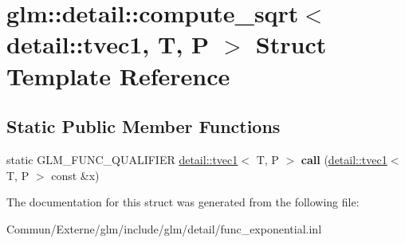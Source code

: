 \hypertarget{structglm_1_1detail_1_1compute__sqrt_3_01detail_1_1tvec1_00_01_t_00_01_p_01_4}{}\section{glm\+:\+:detail\+:\+:compute\+\_\+sqrt$<$ detail\+:\+:tvec1, T, P $>$ Struct Template Reference}
\label{structglm_1_1detail_1_1compute__sqrt_3_01detail_1_1tvec1_00_01_t_00_01_p_01_4}
\subsection*{Static Public Member Functions}
\begin{DoxyCompactItemize}
\item 
static G\+L\+M\+\_\+\+F\+U\+N\+C\+\_\+\+Q\+U\+A\+L\+I\+F\+I\+ER \hyperlink{structglm_1_1detail_1_1tvec1}{detail\+::tvec1}$<$ T, P $>$ {\bfseries call} (\hyperlink{structglm_1_1detail_1_1tvec1}{detail\+::tvec1}$<$ T, P $>$ const \&x)\hypertarget{structglm_1_1detail_1_1compute__sqrt_3_01detail_1_1tvec1_00_01_t_00_01_p_01_4_a19be057111b1a9d9459f75355ac256f5}{}\label{structglm_1_1detail_1_1compute__sqrt_3_01detail_1_1tvec1_00_01_t_00_01_p_01_4_a19be057111b1a9d9459f75355ac256f5}

\end{DoxyCompactItemize}


The documentation for this struct was generated from the following file\+:\begin{DoxyCompactItemize}
\item 
Commun/\+Externe/glm/include/glm/detail/func\+\_\+exponential.\+inl\end{DoxyCompactItemize}

